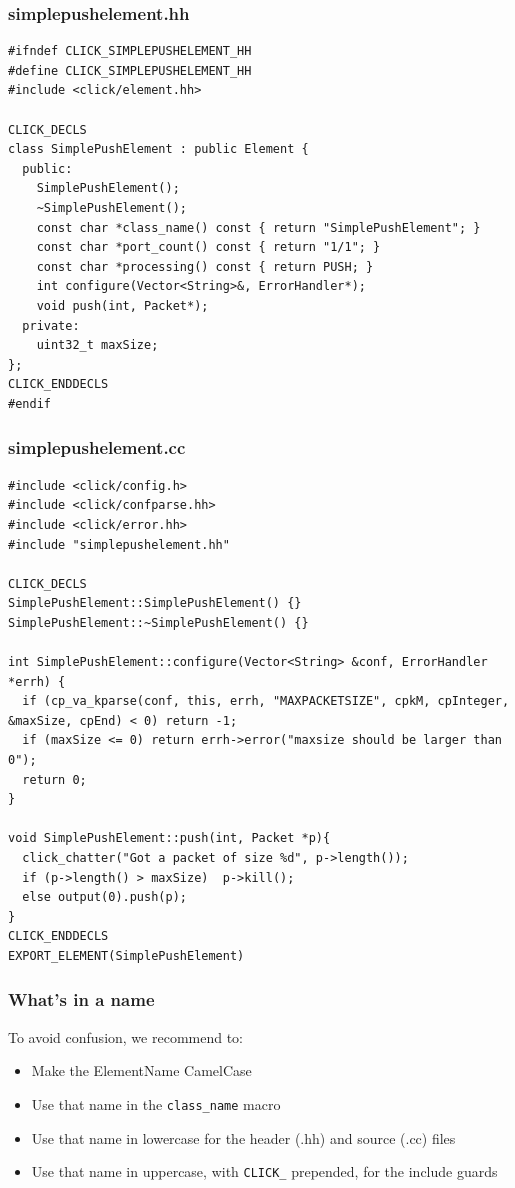 \documentclass{beamer}
\begin{document}
\begin{frame}[fragile]
\frametitle{simplepushelement.hh}
\begin{lstlisting}[basicstyle=\scriptsize]
#ifndef CLICK_SIMPLEPUSHELEMENT_HH
#define CLICK_SIMPLEPUSHELEMENT_HH
#include <click/element.hh>

CLICK_DECLS
class SimplePushElement : public Element { 
  public:
    SimplePushElement();
    ~SimplePushElement();
    const char *class_name() const { return "SimplePushElement"; }
    const char *port_count() const { return "1/1"; }
    const char *processing() const { return PUSH; }
    int configure(Vector<String>&, ErrorHandler*);
    void push(int, Packet*);
  private:
    uint32_t maxSize;
};
CLICK_ENDDECLS
#endif
\end{lstlisting}
\end{frame}

\begin{frame}
\frametitle{simplepushelement.cc}
\begin{lstlisting}[basicstyle=\scriptsize]
#include <click/config.h>
#include <click/confparse.hh>
#include <click/error.hh>
#include "simplepushelement.hh"

CLICK_DECLS
SimplePushElement::SimplePushElement() {}
SimplePushElement::~SimplePushElement() {}

int SimplePushElement::configure(Vector<String> &conf, ErrorHandler *errh) {
  if (cp_va_kparse(conf, this, errh, "MAXPACKETSIZE", cpkM, cpInteger, &maxSize, cpEnd) < 0) return -1;
  if (maxSize <= 0) return errh->error("maxsize should be larger than 0");
  return 0;
}

void SimplePushElement::push(int, Packet *p){
  click_chatter("Got a packet of size %d", p->length());
  if (p->length() > maxSize)  p->kill();
  else output(0).push(p);
}
CLICK_ENDDECLS
EXPORT_ELEMENT(SimplePushElement)
\end{lstlisting}
\end{frame}

\begin{frame}[fragile]
\frametitle{What's in a name}
To avoid confusion, we recommend to:
\begin{itemize}
	\item Make the ElementName CamelCase
	\item Use that name in the \lstinline!class_name! macro
	\item Use that name in lowercase for the header (.hh) and source (.cc) files
	\item Use that name in uppercase, with \lstinline!CLICK_! prepended, for the include guards
\end{itemize}
\end{frame}
\end{document}
